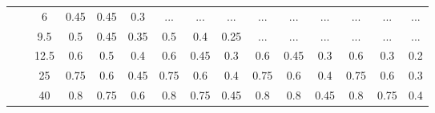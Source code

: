\documentclass[15.5pt]{article}
\begin{document}
\begin{table}[]
{\begin{tabular}{ccccccccccccccc}
  &  
  &   6    & 0.45 & 0.45 & 0.3  & ...  & ... & ... & ... & ... & ... & ... & ... & ... \\
  & & 9.5  & 0.5  & 0.45 & 0.35 & 0.5  & 0.4 & 0.25 & ... & ... & ... & ... & ... & ... \\
  & & 12.5 & 0.6  & 0.5  & 0.4  & 0.6  & 0.45 & 0.3 & 0.6 & 0.45 & 0.3 & 0.6 & 0.3 & 0.2 \\
  & & 25   & 0.75 & 0.6  & 0.45 & 0.75 & 0.6 & 0.4 & 0.75 & 0.6 & 0.4 & 0.75 & 0.6 & 0.3 \\
  & & 40   & 0.8  & 0.75 & 0.6  & 0.8  & 0.75 & 0.45 & 0.8 & 0.8 & 0.45 & 0.8 & 0.75 & 0.4 \\
  \hline
  \end{tabular}
  }
  \label{tab:my-table}
\end{table}
\end{document}

